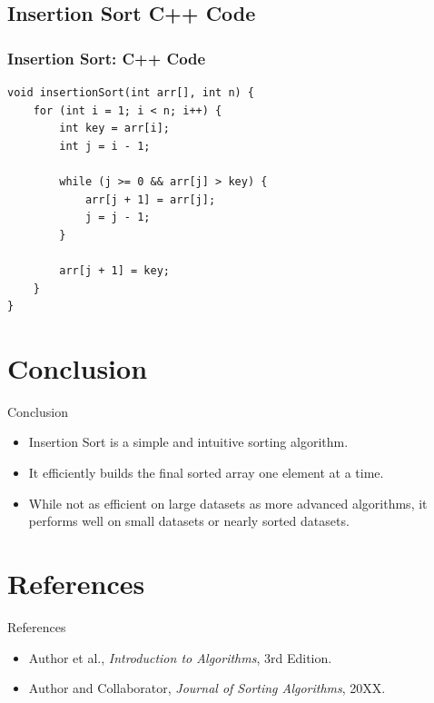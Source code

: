 \documentclass{beamer}
\begin{document}
\subsection{Insertion Sort C++ Code}
\begin{frame}[fragile]
  \frametitle{Insertion Sort: C++ Code}
  
\begin{mybox}
\begin{verbatim}
void insertionSort(int arr[], int n) {
    for (int i = 1; i < n; i++) {
        int key = arr[i];
        int j = i - 1;

        while (j >= 0 && arr[j] > key) {
            arr[j + 1] = arr[j];
            j = j - 1;
        }

        arr[j + 1] = key;
    }
}
\end{verbatim} 
\end{mybox}


\end{frame}

\section{Conclusion}
\begin{frame}{Conclusion}
  \begin{itemize}
    \item Insertion Sort is a simple and intuitive sorting algorithm.
    \item It efficiently builds the final sorted array one element at a time.
    \item While not as efficient on large datasets as more advanced algorithms, it performs well on small datasets or nearly sorted datasets.
  \end{itemize}
\end{frame}

\section{References}
\begin{frame}{References}
  \begin{itemize}
    \item Author et al., \emph{Introduction to Algorithms}, 3rd Edition.
    \item Author and Collaborator, \emph{Journal of Sorting Algorithms}, 20XX.
  \end{itemize}
\end{frame}


\end{document}
